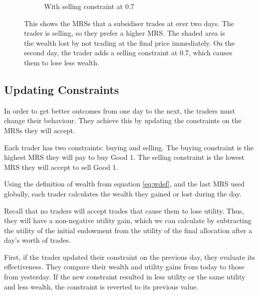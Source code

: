 \documentclass[12pt,a4paper,titlepage]{article}
\begin{document}
\begin{figure}[t]
\begin{subfigure}{.4\linewidth}
    \caption{With selling constraint at 0.7}
  \end{subfigure}%
  
  \caption{
    This shows the MRSs that a subsidiser trades at over two days.
    The trader is selling, so they prefer a higher MRS.
    The shaded area is the wealth lost by not trading at the final price immediately.
    On the second day, the trader adds a selling constraint at 0.7, which causes them to lose less wealth.
  }
  \label{fig:wealth}
\end{figure}

\subsection{Updating Constraints}
In order to get better outcomes from one day to the next, the traders must change their behaviour.
They achieve this by updating the constraints on the MRSs they will accept.

Each trader has two constraints: buying and selling.
The buying constraint is the highest MRS they will pay to buy Good 1.
The selling constraint is the lowest MRS they will accept to sell Good 1.

Using the definition of wealth from equation \ref{eq:wdef}, and the last MRS used globally, each trader calculates the wealth they gained or lost during the day.

Recall that no traders will accept trades that cause them to lose utility. 
Thus, they will have a non-negative utility gain, which we can calculate by subtracting the utility of the initial endowment from the utility of the final allocation after a day's worth of trades.

First, if the trader updated their constraint on the previous day, they evaluate its effectiveness.
They compare their wealth and utility gains from today to those from yesterday.
If the new constraint resulted in less utility or the same utility and less wealth, the constraint is reverted to its previous value.
\end{document}
